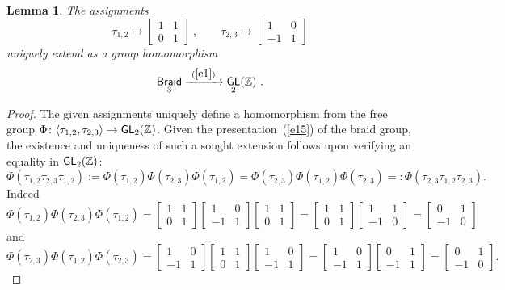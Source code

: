 \documentclass{amsart}
\newtheorem{lemma}[theorem]{Lemma}
\theoremstyle{definition}
\theoremstyle{remark}
\newcommand{\lag}{\langle}
\newcommand{\rag}{\rangle}
\newcommand{\xra}{\xrightarrow}
\DeclareMathOperator{\Braid}{\sf Braid}
\DeclareMathOperator{\GL}{\sf GL}
\begin{document}
\begin{lemma} \label{t95}
The assignments
\[
\tau_{1,2} 
\mapsto
\begin{bmatrix} 1 & 1 \\ 0 & 1 \end{bmatrix}
~,\qquad
\tau_{2,3}
\mapsto 
\begin{bmatrix} 1 & 0 \\ -1 & 1 \end{bmatrix}
\]
uniquely extend as a group homomorphism
\[
\Braid_3 \xra{~(\ref{e1})~} \GL_2(\ZZ)
~.
\]
\end{lemma}
\begin{proof}
The given assignments uniquely define a homomorphism from the free group
$\Phi \colon \lag \tau_{1,2} , \tau_{2,3} \rag \to \GL_2(\ZZ)$.  
Given the presentation~(\ref{e15}) of the braid group, the existence and uniqueness of such a sought extension follows upon verifying an equality in $\GL_2(\ZZ)$:
$$\Phi(\tau_{1,2}\tau_{2,3}\tau_{1,2}) := \Phi(\tau_{1,2})\Phi(\tau_{2,3})\Phi(\tau_{1, 2}) = \Phi(\tau_{2,3}) \Phi(\tau_{1,2}) \Phi(\tau_{2,3}) =: \Phi(\tau_{2,3} \tau_{1,2} \tau_{2,3}).$$ Indeed  $$\Phi(\tau_{1,2})\Phi(\tau_{2,3})\Phi(\tau_{1, 2}) = \begin{bmatrix} 1 & 1 \\ 0 & 1 \end{bmatrix}   \begin{bmatrix} 1 & 0 \\ -1 & 1 \end{bmatrix}   \begin{bmatrix} 1 & 1 \\ 0 & 1 \end{bmatrix} =  \begin{bmatrix} 1 & 1 \\ 0 & 1 \end{bmatrix}  \begin{bmatrix} 1 & 1 \\ -1 & 0 \end{bmatrix} =  \begin{bmatrix} 0 & 1 \\ -1 & 0 \end{bmatrix}  $$ and 
$$\Phi(\tau_{2,3}) \Phi(\tau_{1,2}) \Phi(\tau_{2,3})  =  \begin{bmatrix} 1 & 0 \\ -1 & 1 \end{bmatrix}   \begin{bmatrix} 1 & 1 \\ 0 & 1 \end{bmatrix}   \begin{bmatrix} 1 & 0 \\ -1 & 1 \end{bmatrix} =  \begin{bmatrix} 1 & 0 \\ -1 & 1 \end{bmatrix}   \begin{bmatrix} 0 & 1 \\ -1 & 1 \end{bmatrix}  =  \begin{bmatrix} 0 & 1 \\ -1 & 0 \end{bmatrix}.$$
\end{proof}
\end{document}
